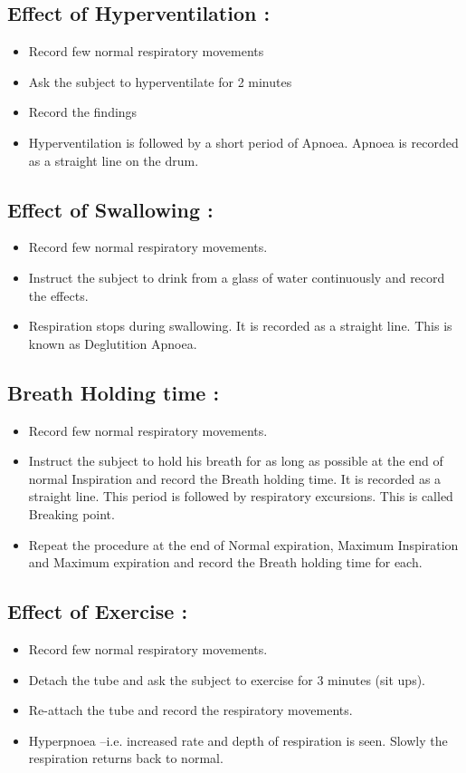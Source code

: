 \documentclass[a4paper,12pt,openany,twoside]{book}
\begin{document}
\subsection*{Effect of Hyperventilation :}
\begin{itemize}
\item{Record few normal respiratory movements}
\item{Ask the subject to hyperventilate for 2 minutes}
\item{Record the findings}
\item{Hyperventilation is followed by a short period of Apnoea. Apnoea is recorded as a straight line on the drum.}
\end{itemize}
\subsection*{Effect of Swallowing :}
\begin{itemize}
\item{Record few normal respiratory movements.}
\item{Instruct the subject to drink from a glass of water continuously and record the effects.}
\item{Respiration stops during swallowing. It is recorded as a straight line. This is known as Deglutition Apnoea.}
\end{itemize}

\subsection*{Breath Holding time :}
\begin{itemize}
\item{Record few normal respiratory movements.}
\item{Instruct the subject to hold his breath for as long as possible at the end of normal Inspiration and record the Breath holding time. It is recorded as a straight line. This period is followed by respiratory excursions. This is called Breaking point.}
\item{Repeat the procedure at the end of Normal expiration, Maximum Inspiration and Maximum expiration and record the Breath holding time for each.}
\end{itemize}

\subsection*{Effect of Exercise :}
\begin{itemize}
\item{Record few normal respiratory movements.}
\item{Detach the tube and ask the subject to exercise for 3 minutes (sit ups).}
\item{Re-attach the tube and record the respiratory movements.}
\item{Hyperpnoea –i.e. increased rate and depth of respiration is seen. Slowly the respiration returns back to normal.}
\end{itemize}
\end{document}
